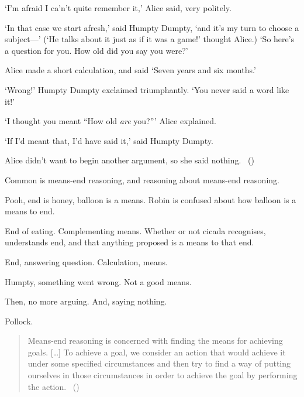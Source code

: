 \begin{note}
  \begin{scenario}
    `I'm afraid I ca'n't quite remember it,'
    Alice said, very politely.

    \noindent%
    `In that case we start afresh,'
    said Humpty Dumpty,
    `and it's my turn to choose a subject---'
    (`He talks about it just as if it was a game!' thought Alice.)
    `So here's a question for you. How old did you say you were?'

    \noindent%
    Alice made a short calculation, and said
    `Seven years and six months.'

    \noindent%
    `Wrong!'
    Humpty Dumpty exclaimed triumphantly.
    `You never said a word like it!'

    \noindent%
    `I thought you meant ``How old \emph{are} you?'''
    Alice explained.

    \noindent%
    `If I'd meant that, I'd have said it,'
    said Humpty Dumpty.

    \noindent%
    Alice didn't want to begin another argument, so she said nothing.\newline
    \mbox{ }\hfill\mbox{(\cite[188]{Carroll:2009aa})}
  \end{scenario}
\end{note}

\begin{note}
  Common is means-end reasoning, and reasoning about means-end reasoning.

  Pooh, end is honey, balloon is a means.
  Robin is confused about how balloon is a means to end.

  End of eating.
  Complementing means.
  Whether or not cicada recognises, understands end, and that anything proposed is a means to that end.

  End, answering question.
  Calculation, means.

  Humpty, something went wrong.
  Not a good means.

  Then, no more arguing.
  And, saying nothing.
\end{note}

\begin{note}
  Pollock.

  \begin{quote}
    Means-end reasoning is concerned with finding the means for achieving goals.
    [\dots]
    To achieve a goal, we consider an action that would achieve it under some specified circumstances and then try to find a way of putting ourselves in those circumstances in order to achieve the goal by performing the action.%
    \mbox{ }\hfill\mbox{(\cite[60]{Pollock:2002aa})}
  \end{quote}
\end{note}

